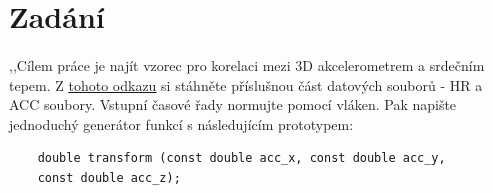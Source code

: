 \documentclass[12pt, a4paper]{article}
\begin{document}
\newpage


\tableofcontents
\newpage

\section{Zadání}
\paragraph{} ,,Cílem práce je najít vzorec pro korelaci mezi 3D akcelerometrem a srdečním tepem. 
Z \href{https://physionet.org/content/big-ideas-glycemic-wearable/1.1.2/}{\underline{tohoto odkazu}} si stáhněte příslušnou část datových souborů - HR a ACC soubory. 
Vstupní časové řady normujte pomocí vláken. 
Pak napište jednoduchý generátor funkcí s následujícím prototypem:

\begin{center}
  \begin{verbatim}
    double transform (const double acc_x, const double acc_y, 
    const double acc_z);
  \end{verbatim}
  \label{code-transform}
\end{center}
\end{document}
